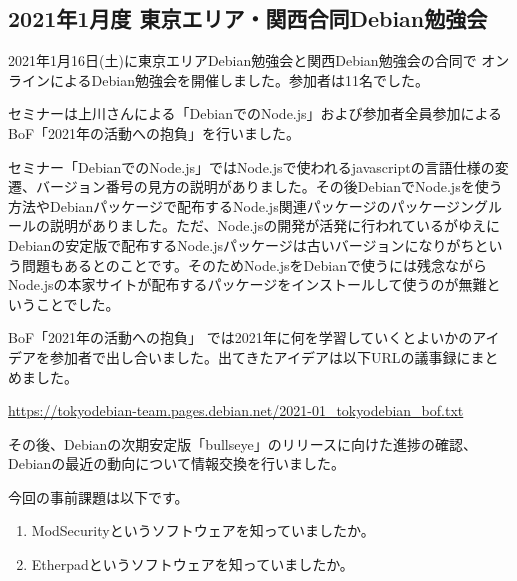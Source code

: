 \documentclass[mingoth,a4paper]{jsarticle}
\begin{document}

\subsection{2021年1月度 東京エリア・関西合同Debian勉強会}

2021年1月16日(土)に東京エリアDebian勉強会と関西Debian勉強会の合同で
オンラインによるDebian勉強会を開催しました。参加者は11名でした。

セミナーは上川さんによる「DebianでのNode.js」および参加者全員参加によるBoF「2021年の活動への抱負」を行いました。

セミナー「DebianでのNode.js」ではNode.jsで使われるjavascriptの言語仕様の変遷、バージョン番号の見方の説明がありました。その後DebianでNode.jsを使う方法やDebianパッケージで配布するNode.js関連パッケージのパッケージングルールの説明がありました。ただ、Node.jsの開発が活発に行われているがゆえにDebianの安定版で配布するNode.jsパッケージは古いバージョンになりがちという問題もあるとのことです。そのためNode.jsをDebianで使うには残念ながらNode.jsの本家サイトが配布するパッケージをインストールして使うのが無難ということでした。

BoF「2021年の活動への抱負」 では2021年に何を学習していくとよいかのアイデアを参加者で出し合いました。出てきたアイデアは以下URLの議事録にまとめました。

\url{https://tokyodebian-team.pages.debian.net/2021-01_tokyodebian_bof.txt}

その後、Debianの次期安定版「bullseye」のリリースに向けた進捗の確認、
Debianの最近の動向について情報交換を行いました。


今回の事前課題は以下です。

\begin{enumerate}
\item ModSecurityというソフトウェアを知っていましたか。
\item Etherpadというソフトウェアを知っていましたか。
\end{enumerate}


\begin{multicols}{2}
{\small

}
\end{multicols}

%
%
%
%
\end{document}
